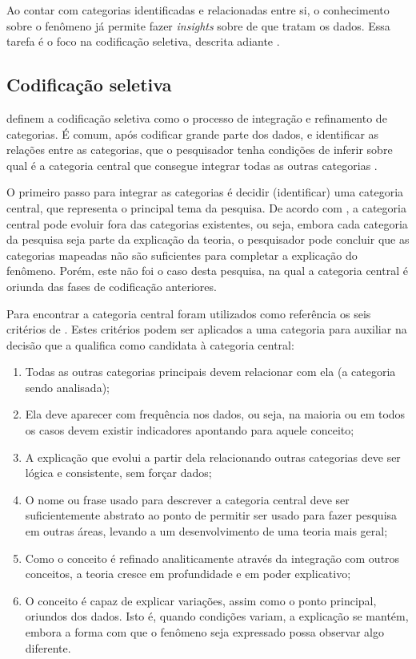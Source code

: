 Ao contar com categorias identificadas e relacionadas entre si, o conhecimento sobre o fenômeno já permite fazer \textit{insights} sobre de que tratam os dados. Essa tarefa é o foco na codificação seletiva, descrita adiante \cite{bandeira:03}.

	\subsection{Codificação seletiva}

 definem a codificação seletiva como o processo de integração e refinamento de categorias. É comum, após codificar grande parte dos dados, e identificar as relações entre as categorias, que o pesquisador tenha condições de inferir sobre qual é a categoria central que consegue integrar todas as outras categorias \cite{bandeira:03}.

O primeiro passo para integrar as categorias é decidir (identificar) uma categoria central, que representa o principal tema da pesquisa. De acordo com , a categoria central pode evoluir fora das categorias existentes, ou seja, embora cada categoria da pesquisa seja parte da explicação da teoria, o pesquisador pode concluir que as categorias mapeadas não são suficientes para completar a explicação do fenômeno. Porém, este não foi o caso desta pesquisa, na qual a categoria central é oriunda das fases de codificação anteriores.

Para encontrar a categoria central foram utilizados como referência os seis critérios de . Estes critérios podem ser aplicados a uma categoria para auxiliar na decisão que a qualifica como candidata à categoria central:

\begin{enumerate}
\item Todas as outras categorias principais devem relacionar com ela (a categoria sendo analisada);
\item Ela deve aparecer com frequência nos dados, ou seja, na maioria ou em todos os casos devem existir indicadores apontando para aquele conceito;
\item A explicação que evolui a partir dela relacionando outras categorias deve ser lógica e consistente, sem forçar dados;
\item O nome ou frase usado para descrever a categoria central deve ser suficientemente abstrato ao ponto de permitir ser usado para fazer pesquisa em outras áreas, levando a um desenvolvimento de uma teoria mais geral;
\item Como o conceito é refinado analiticamente através da integração com outros conceitos, a teoria cresce em profundidade e em poder explicativo;
\item O conceito é capaz de explicar variações, assim como o ponto principal, oriundos dos dados. Isto é, quando condições variam, a explicação se mantém, embora a forma com que o fenômeno seja expressado possa observar algo diferente.
\end{enumerate}

